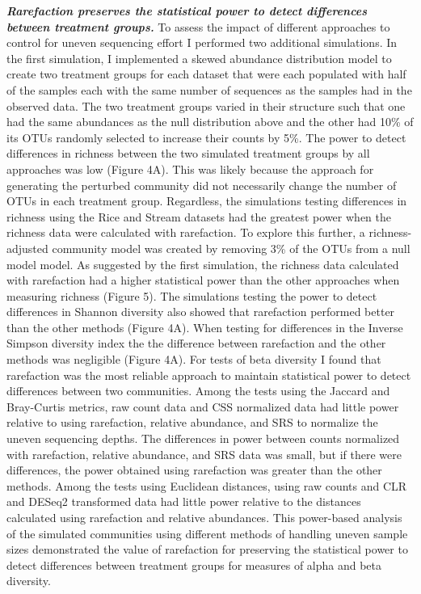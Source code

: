 \documentclass[
]{article}
\begin{document}
\textbf{\emph{Rarefaction preserves the statistical power to detect
differences between treatment groups.}} To assess the impact of
different approaches to control for uneven sequencing effort I performed
two additional simulations. In the first simulation, I implemented a
skewed abundance distribution model to create two treatment groups for
each dataset that were each populated with half of the samples each with
the same number of sequences as the samples had in the observed data.
The two treatment groups varied in their structure such that one had the
same abundances as the null distribution above and the other had 10\% of
its OTUs randomly selected to increase their counts by 5\%. The power to
detect differences in richness between the two simulated treatment
groups by all approaches was low (Figure 4A). This was likely because
the approach for generating the perturbed community did not necessarily
change the number of OTUs in each treatment group. Regardless, the
simulations testing differences in richness using the Rice and Stream
datasets had the greatest power when the richness data were calculated
with rarefaction. To explore this further, a richness-adjusted community
model was created by removing 3\% of the OTUs from a null model model.
As suggested by the first simulation, the richness data calculated with
rarefaction had a higher statistical power than the other approaches
when measuring richness (Figure 5). The simulations testing the power to
detect differences in Shannon diversity also showed that rarefaction
performed better than the other methods (Figure 4A). When testing for
differences in the Inverse Simpson diversity index the the difference
between rarefaction and the other methods was negligible (Figure 4A).
For tests of beta diversity I found that rarefaction was the most
reliable approach to maintain statistical power to detect differences
between two communities. Among the tests using the Jaccard and
Bray-Curtis metrics, raw count data and CSS normalized data had little
power relative to using rarefaction, relative abundance, and SRS to
normalize the uneven sequencing depths. The differences in power between
counts normalized with rarefaction, relative abundance, and SRS data was
small, but if there were differences, the power obtained using
rarefaction was greater than the other methods. Among the tests using
Euclidean distances, using raw counts and CLR and DESeq2 transformed
data had little power relative to the distances calculated using
rarefaction and relative abundances. This power-based analysis of the
simulated communities using different methods of handling uneven sample
sizes demonstrated the value of rarefaction for preserving the
statistical power to detect differences between treatment groups for
measures of alpha and beta diversity.
\end{document}
